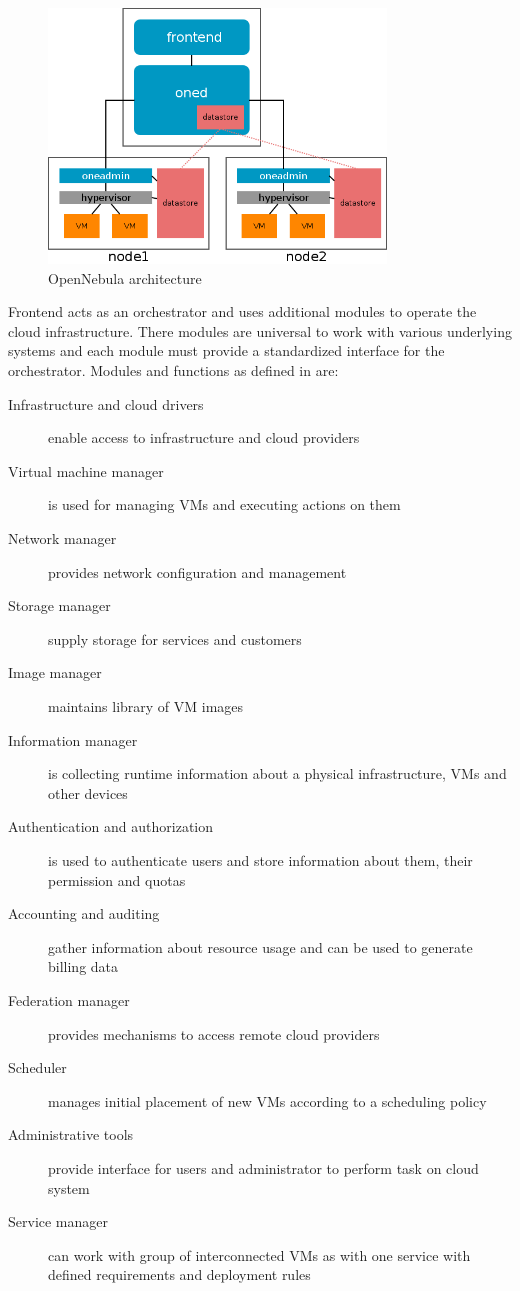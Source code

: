 \begin{figure}[htb]
	\begin{center}
	\includegraphics[width=0.8\textwidth]{opennebula-arch.png}
	\end{center}
	\caption{OpenNebula architecture}
	\label{img:opennebula-arch}
\end{figure}

Frontend acts as an orchestrator and uses additional modules to operate the cloud infrastructure. There modules are universal to work with various underlying systems and each module must provide a standardized interface for the orchestrator. Modules and functions as defined in \cite{opennebula} are:
\begin{description}
	\item[Infrastructure and cloud drivers] enable access to infrastructure and cloud providers
	\item[Virtual machine manager] is used for managing \Ac{VM}s and executing actions on them
	\item[Network manager] provides network configuration and management
	\item[Storage manager] supply storage for services and customers
	\item[Image manager] maintains library of \Ac{VM} images
	\item[Information manager] is collecting runtime information about a physical infrastructure, \Ac{VM}s and other devices
	\item[Authentication and authorization] is used to authenticate users and store information about them, their permission and quotas
	\item[Accounting and auditing] gather information about resource usage and can be used to generate billing data
	\item[Federation manager] provides mechanisms to access remote cloud providers
	\item[Scheduler] manages initial placement of new \Ac{VM}s according to a scheduling policy
	\item[Administrative tools] provide interface for users and administrator to perform task on cloud system
	\item[Service manager] can work with group of interconnected \Ac{VM}s as with one service with defined requirements and deployment rules
\end{description}


